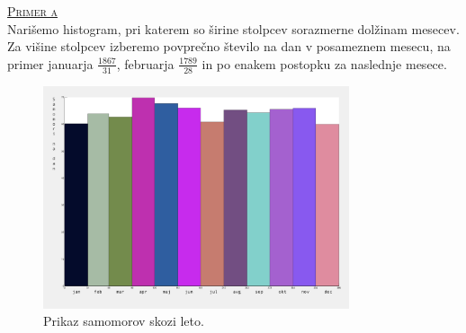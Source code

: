 \documentclass[a4paper,12pt]{article}
\begin{document}
\noindent
\textsc{\underline{Primer a}}
\\
Narišemo histogram, pri katerem so širine stolpcev sorazmerne dolžinam mesecev. 
Za višine stolpcev izberemo povprečno število na dan v posameznem mesecu, na primer januarja $\frac{1867}{31}$, februarja $\frac{1789}{28}$ in po enakem postopku za naslednje mesece.

\begin{figure}[ht!]
    \centering
    \includegraphics[width=90mm]{hist.png}
    \caption{Prikaz samomorov skozi leto.}
\end{figure}
\end{document}
